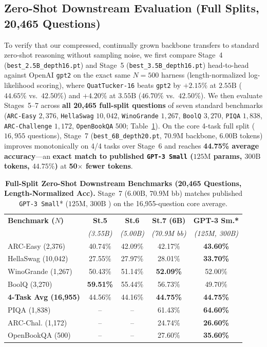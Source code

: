\documentclass[10pt,twocolumn]{article}
\newcommand{\toprule}{\hline\hline}
\newcommand{\midrule}{\hline}
\newcommand{\bottomrule}{\hline\hline}
\newcommand{\citep}[1]{\cite{#1}}
\begin{document}
\subsection{Zero-Shot Downstream Evaluation (Full Splits, 20,465 Questions)}
To verify that our compressed, continually grown backbone transfers to standard zero-shot reasoning without sampling noise, we first compare Stage~4 (\texttt{best\_2.5B\_depth16.pt}) and Stage~5 (\texttt{best\_3.5B\_depth16.pt}) head-to-head against OpenAI \texttt{gpt2} on the exact same $N=500$ harness (length-normalized log-likelihood scoring), where \texttt{QuatTucker-16} beats \texttt{gpt2} by $+2.15\%$ at $2.55\text{B}$ ($44.65\%$ vs.\ $42.50\%$) and $+4.20\%$ at $3.55\text{B}$ ($46.70\%$ vs.\ $42.50\%$). We then evaluate Stages~5--7 across \textbf{all 20,465 full-split questions} of seven standard benchmarks (\texttt{ARC-Easy} $2{,}376$, \texttt{HellaSwag} $10{,}042$, \texttt{WinoGrande} $1{,}267$, \texttt{BoolQ} $3{,}270$, \texttt{PIQA} $1{,}838$, \texttt{ARC-Challenge} $1{,}172$, \texttt{OpenBookQA} $500$; Table~\ref{tab:zeroshot}). On the core 4-task full split ($16{,}955$ questions), Stage~7 (\texttt{best\_6B\_depth20.pt}, $70.9\text{M}$ backbone, $6.00\text{B}$ tokens) improves monotonically on 4/4 tasks over Stage~6 and reaches \textbf{44.75\% average accuracy}---an \textbf{exact match to published \texttt{GPT-3 Small} ($125\text{M}$ params, $300\text{B}$ tokens, $44.75\%$)} at \textbf{50$\times$ fewer tokens}.

\begin{table}[h!]
\centering
\caption{\textbf{Full-Split Zero-Shot Downstream Benchmarks (20,465 Questions, Length-Normalized Acc).} Stage~7 ($6.00\text{B}$, $70.9\text{M}$ bb) matches published \texttt{GPT-3 Small}* ($125\text{M}$, $300\text{B}$ \citep{brown2020language}) on the 16,955-question core average.}
\label{tab:zeroshot}
\scriptsize
\setlength{\tabcolsep}{2.2pt}
\begin{tabular}{lcccc}
\toprule
\textbf{Benchmark ($N$)} & \textbf{St.5} & \textbf{St.6} & \textbf{St.7 (6B)} & \textbf{GPT-3 Sm.*} \\
 & \emph{(3.55B)} & \emph{(5.00B)} & \emph{(70.9M bb)} & \emph{(125M, 300B)} \\
\midrule
ARC-Easy (2,376) & 40.74\% & 42.09\% & 42.17\% & \textbf{43.60\%} \\
HellaSwag (10,042) & 27.55\% & 27.97\% & 28.01\% & \textbf{33.70\%} \\
WinoGrande (1,267) & 50.43\% & 51.14\% & \textbf{52.09\%} & 52.00\% \\
BoolQ (3,270) & \textbf{59.51\%} & 55.44\% & 56.73\% & 49.70\% \\
\midrule
\textbf{4-Task Avg (16,955)} & 44.56\% & 44.16\% & \textbf{44.75\%} & \textbf{44.75\%} \\
\midrule
PIQA (1,838) & -- & -- & 61.43\% & \textbf{64.60\%} \\
ARC-Chal. (1,172) & -- & -- & 24.74\% & \textbf{26.60\%} \\
OpenBookQA (500) & -- & -- & 27.60\% & \textbf{35.60\%} \\
\bottomrule
\end{tabular}
\end{table}
\end{document}
